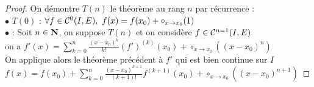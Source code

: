     ${}$\\ 
    \begin{proof}
    On démontre $T(n)$ le théorème au rang $n$ par récurrence : \\ $\bullet$ $T(0)$ : $\forall f\in {\mathcal{C}}^0(I,E),~f(x) = f(x_0) + 
    \circ_{x\rightarrow x_0} (1)$ \\ $\bullet$ : Soit $n\in{\mathbf{N}}$, on suppose $T(n)$ et on considère $f\in{\mathcal{C}}^{n=1}(I,E)$ \\ on a $f'(x) = 
    \sum_{k=0}^n \frac{(x-x_0)^k}{k!} (f')^{(k)} (x_0) + \circ_{x\rightarrow x_0} \left( (x-x_0)^n \right)$ \\On applique alors le théorème 
    précédent à $f'$ qui est bien continue sur $I$ \\ $f(x) = f(x_0) + \sum_{k=0}^n \frac{(x-x_0)^{k+1}}{(k+1)!} f^{(k+1)} (x_0) + 
    \circ_{x\rightarrow x_0} \left( (x-x_0)^{n+1} \right)$
    \end{proof} ${}$ \\
    \begin{center}
    \fin
    \end{center}